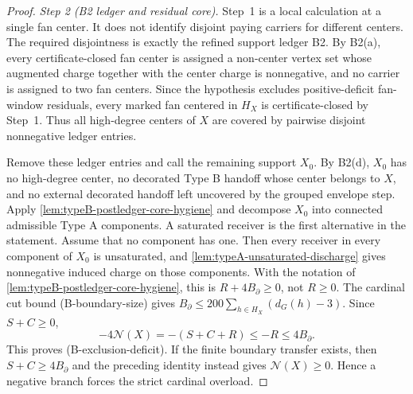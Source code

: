 \documentclass[11pt]{article}
\newtheorem{remark}[theorem]{Remark}
\newcommand{\No}{\mathcal N}
\begin{document}
\begin{proof}
\emph{Step 2 (B2 ledger and residual core).}  Step~1 is a local calculation at a
single fan center.  It does not identify disjoint paying carriers for different
centers.  The required disjointness is exactly the refined support ledger B2.  By
B2(a), every certificate-closed fan center is assigned a non-center vertex set
whose augmented charge together with the center charge is nonnegative, and no
carrier is assigned to two fan centers.
Since the hypothesis excludes positive-deficit fan-window residuals, every
marked fan centered in $H_X$ is certificate-closed by Step~1.  Thus all
high-degree centers of $X$ are covered by pairwise disjoint nonnegative ledger
entries.

Remove these ledger entries and call the remaining support $X_0$.  By B2(d),
$X_0$ has no high-degree center, no decorated Type B handoff whose center
belongs to \(X\), and no external decorated handoff left uncovered by the
grouped envelope step.  Apply \cref{lem:typeB-postledger-core-hygiene} and
decompose \(X_0\) into connected admissible Type A components.  A saturated
receiver is the first alternative in the statement.  Assume that no component
has one.  Then every receiver in every component of \(X_0\) is unsaturated, and
\cref{lem:typeA-unsaturated-discharge} gives nonnegative induced charge on
those components.  With the notation of
\cref{lem:typeB-postledger-core-hygiene}, this is \(R+4B_\partial\ge0\), not
\(R\ge0\).  The cardinal cut bound \textup{(B-boundary-size)} gives
\(B_\partial\le200\sum_{h\in H_X}(d_G(h)-3)\).  Since \(S+C\ge0\),
\[
-4\No(X)=-(S+C+R)\le-R\le4B_\partial.
\]
This proves \textup{(B-exclusion-deficit)}.  If the finite boundary transfer
exists, then \(S+C\ge4B_\partial\) and the preceding identity instead gives
\(\No(X)\ge0\).  Hence a negative branch forces the strict cardinal overload.
\end{proof}

\end{document}
